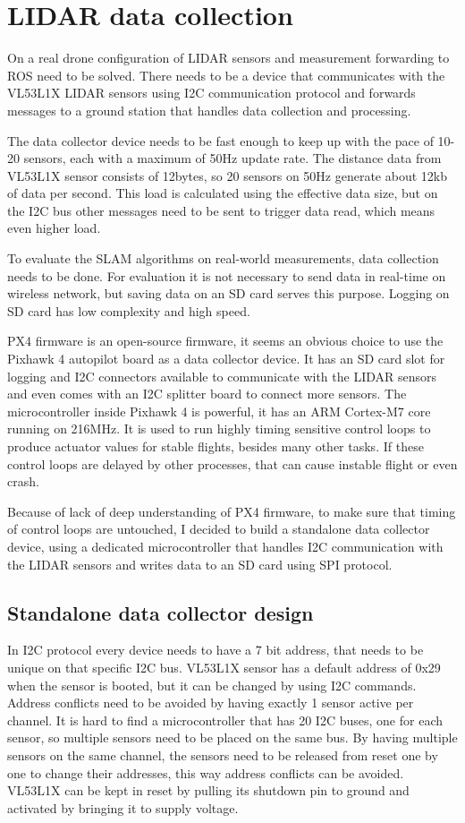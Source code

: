 \section{LIDAR data collection}
On a real drone configuration of LIDAR sensors and measurement forwarding to ROS need to be solved. 
There needs to be a device that communicates with the VL53L1X LIDAR sensors using I2C communication 
protocol and forwards messages to a ground station that handles data collection and processing.

The data collector device needs to be fast enough to keep up with the pace of 10-20 sensors,
each with a maximum of 50Hz update rate. The distance data from VL53L1X sensor consists of 12bytes, 
so 20 sensors on 50Hz generate about 12kb of data per second. This load is calculated using the 
effective data size, but on the I2C bus other messages need to be sent to trigger data read,
which means even higher load.

To evaluate the SLAM algorithms on real-world measurements, data collection needs to be done. 
For evaluation it is not necessary to send data in real-time on wireless network, but saving 
data on an SD card serves this purpose. Logging on SD card has low complexity and high speed. 

PX4 firmware is an open-source firmware, it seems an obvious choice to use the Pixhawk 4 autopilot board 
as a data collector device. It has an SD card slot for logging and I2C connectors available to
communicate with the LIDAR sensors and even comes with an I2C splitter board to connect more sensors.
The microcontroller inside Pixhawk 4 is powerful, it has an ARM Cortex-M7 core running on 216MHz. 
It is used to run highly timing sensitive control loops to produce actuator values for stable flights,
besides many other tasks. If these control loops are delayed by other processes, that can 
cause instable flight or even crash.

Because of lack of deep understanding of PX4 firmware, to make sure that timing of control loops 
are untouched, I decided to build a standalone data collector device, using a dedicated microcontroller that
handles I2C communication with the LIDAR sensors and writes data to an SD card using SPI protocol.

\subsection{Standalone data collector design}
In I2C protocol every device needs to have a 7 bit address, that needs to be unique on that specific
I2C bus. VL53L1X sensor has a default address of 0x29 when the sensor is booted, but it can be changed
by using I2C commands. Address conflicts need to be avoided by having exactly 1 sensor active per channel.
It is hard to find a microcontroller that has 20 I2C buses, one for each sensor, so multiple sensors
need to be placed on the same bus. By having multiple sensors on the same channel, the sensors need to 
be released from reset one by one to change their addresses, this way address conflicts can be avoided.
VL53L1X can be kept in reset by pulling its shutdown pin to ground and activated by bringing it to 
supply voltage. 

